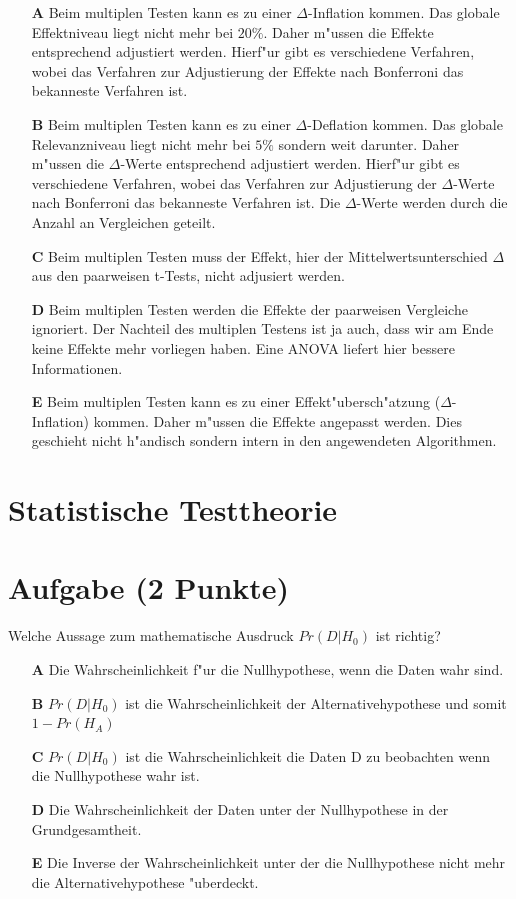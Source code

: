 \documentclass[a4paper, 9pt]{scrartcl}\usepackage[]{graphicx}\usepackage[]{xcolor}
\begin{document}
\begin{enumerate}
\item [\textbf{A} \msquare] Beim multiplen Testen kann es zu einer $\Delta$-Inflation kommen. Das globale Effektniveau liegt nicht mehr bei $20\%$. Daher m{"u}ssen die Effekte entsprechend adjustiert werden. Hierf{"u}r gibt es verschiedene Verfahren, wobei das Verfahren zur Adjustierung der Effekte nach Bonferroni das bekanneste Verfahren ist.
\item [\textbf{B} \msquare] Beim multiplen Testen kann es zu einer $\Delta$-Deflation kommen. Das globale Relevanzniveau liegt nicht mehr bei $5\%$ sondern weit darunter. Daher m{"u}ssen die $\Delta$-Werte entsprechend adjustiert werden. Hierf{"u}r gibt es verschiedene Verfahren, wobei das Verfahren zur Adjustierung der $\Delta$-Werte nach Bonferroni das bekanneste Verfahren ist. Die $\Delta$-Werte werden durch die Anzahl an Vergleichen geteilt.
\item [\textbf{C} \msquare] Beim multiplen Testen muss der Effekt, hier der Mittelwertsunterschied $\Delta$ aus den paarweisen t-Tests, nicht adjusiert werden.
\item [\textbf{D} \msquare] Beim multiplen Testen werden die Effekte der paarweisen Vergleiche ignoriert. Der Nachteil des multiplen Testens ist ja auch, dass wir am Ende keine Effekte mehr vorliegen haben. Eine ANOVA liefert hier bessere Informationen.
\item [\textbf{E} \msquare] Beim multiplen Testen kann es zu einer Effekt{"u}bersch{"a}tzung ($\Delta$-Inflation) kommen. Daher m{"u}ssen die Effekte angepasst werden. Dies geschieht nicht h{"a}ndisch sondern intern in den angewendeten Algorithmen.
\end{enumerate}
\section*{Statistische Testtheorie}  

\section{Aufgabe \hfill (2 Punkte)}

Welche Aussage zum mathematische Ausdruck $Pr(D|H_0)$ ist richtig? 



\begin{enumerate}
\item [\textbf{A} \msquare] Die Wahrscheinlichkeit f{"u}r die Nullhypothese, wenn die Daten wahr sind.
\item [\textbf{B} \msquare] $Pr(D|H_0)$ ist die Wahrscheinlichkeit der Alternativehypothese und somit $1 - Pr(H_A)$
\item [\textbf{C} \msquare] $Pr(D|H_0)$ ist die Wahrscheinlichkeit die Daten D zu beobachten wenn die Nullhypothese wahr ist.
\item [\textbf{D} \msquare] Die Wahrscheinlichkeit der Daten unter der Nullhypothese in der Grundgesamtheit.
\item [\textbf{E} \msquare] Die Inverse der Wahrscheinlichkeit unter der die Nullhypothese nicht mehr die Alternativehypothese {"u}berdeckt.
\end{enumerate}
\end{document}
